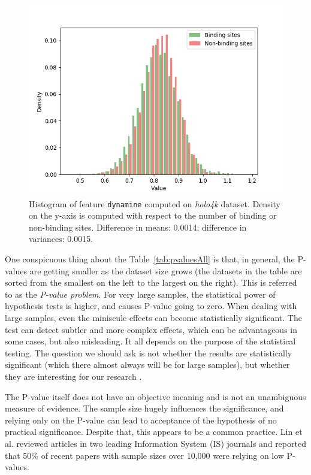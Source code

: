 \begin{figure}[!htbp]
\centering
\includegraphics[width=120mm]{../img/dynamine_hist.png}
\caption{Histogram of feature \texttt{dynamine} computed on \textit{holo4k} dataset. Density on the y-axis is computed with respect to the number of binding or non-binding sites. Difference in means: 0.0014; difference in variances: 0.0015.}
\label{fig:dynamine}
\end{figure}

One conspicuous thing about the Table~\ref{tab:pvaluesAll} is that, in general, the P-values are getting smaller as the dataset size grows (the datasets in the table are sorted from the smallest on the left to the largest on the right). This is referred to as the \textit{P-value problem}. For very large samples, the statistical power of hypothesis tests is higher, and causes P-value going to zero. When dealing with large samples, even the miniscule effects can become statistically significant. The test can detect subtler and more complex effects, which can be advantageous in some cases, but also misleading. It all depends on the purpose of the statistical testing. The question we should ask is not whether the results are statistically significant (which there almost always will be for large samples), but whether they are interesting for our research \cite{pvalueproblem}.

The P-value itself does not have an objective meaning and is not an unambiguous measure of evidence. The sample size hugely influences the significance, and relying only on the P-value can lead to acceptance of the hypothesis of no practical significance. Despite that, this appears to be a common practice. Lin et al. \cite{pvalueproblem} reviewed articles in two leading Information System (IS) journals and reported that 50\% of recent papers with sample sizes over 10,000 were relying on low P-values.

